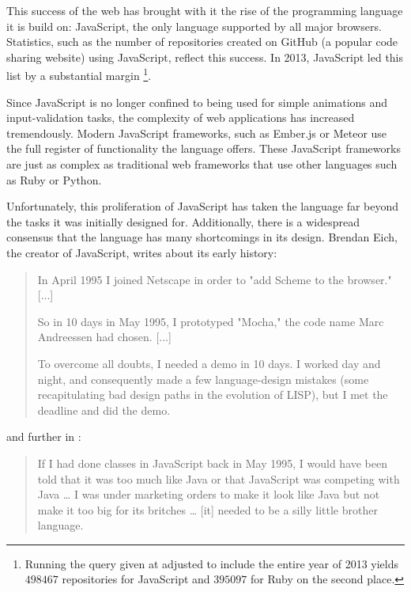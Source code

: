 \documentclass[11pt]{report}
\begin{document}
This success of the web has brought with it the rise of the programming language it is build on: JavaScript, the only language supported by all major browsers. Statistics, such as the number of repositories created on GitHub (a popular code sharing website) using JavaScript, reflect this success. In 2013, JavaScript led this list by a substantial margin \cite{githubarchive, topgithub}\footnote{Running the query given at \cite{topgithub} adjusted to include the entire year of 2013 yields $498467$ repositories for JavaScript and $395097$ for Ruby on the second place.}.

Since JavaScript is no longer confined to being used for simple animations and input-validation tasks, the complexity of web applications has increased tremendously. Modern JavaScript frameworks, such as Ember.js or Meteor use the full register of functionality the language offers. These JavaScript frameworks are just as complex as traditional web frameworks that use other languages such as Ruby or Python.

Unfortunately, this proliferation of JavaScript has taken the language far beyond the tasks it was initially designed for. Additionally, there is a widespread consensus that the language has many shortcomings in its design. Brendan Eich, the creator of JavaScript, writes \cite{brendeich} about its early history:
\begin{quote}
In April 1995 I joined Netscape in order to "add Scheme to the browser." [...]

So in 10 days in May 1995, I prototyped "Mocha," the code name Marc Andreessen had chosen. [...]

To overcome all doubts, I needed a demo in 10 days. I worked day and night, and consequently made a few language-design mistakes (some recapitulating bad design paths in the evolution of LISP), but I met the deadline and did the demo.
\end{quote}

and further in \cite{comparticle}:

\begin{quote}
If I had done classes in JavaScript back in May 1995, I would have been told that it was too much like Java or that JavaScript was competing with Java … I was under marketing orders to make it look like Java but not make it too big for its britches … [it] needed to be a silly little brother language.
\end{quote}
\end{document}
